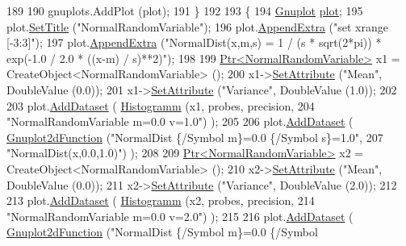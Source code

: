 \begin{DoxyCode}
189 
190     gnuplots.AddPlot (plot);
191   \}
192 
193   \{
194     \hyperlink{classns3_1_1Gnuplot}{Gnuplot} \hyperlink{lte__amc_8m_a5942306abe9f005572e4344e3cdef528}{plot};
195     plot.\hyperlink{classns3_1_1Gnuplot_ac01f15633d49f0239f8a45293a1e04f0}{SetTitle} (\textcolor{stringliteral}{"NormalRandomVariable"});
196     plot.\hyperlink{classns3_1_1Gnuplot_a649a3041b9d0ea21a212b5ad9b28ecbf}{AppendExtra} (\textcolor{stringliteral}{"set xrange [-3:3]"});
197     plot.\hyperlink{classns3_1_1Gnuplot_a649a3041b9d0ea21a212b5ad9b28ecbf}{AppendExtra} (\textcolor{stringliteral}{"NormalDist(x,m,s) = 1 / (s * sqrt(2*pi)) * exp(-1.0 / 2.0 * ((x-m) /
       s)**2)"});
198 
199     \hyperlink{classns3_1_1Ptr}{Ptr<NormalRandomVariable>} x1 = CreateObject<NormalRandomVariable> ();
200     x1->\hyperlink{classns3_1_1ObjectBase_ac60245d3ea4123bbc9b1d391f1f6592f}{SetAttribute} (\textcolor{stringliteral}{"Mean"}, DoubleValue (0.0));
201     x1->\hyperlink{classns3_1_1ObjectBase_ac60245d3ea4123bbc9b1d391f1f6592f}{SetAttribute} (\textcolor{stringliteral}{"Variance"}, DoubleValue (1.0));
202 
203     plot.\hyperlink{classns3_1_1Gnuplot_a306ec724a327cf9ab699700f31fca0a1}{AddDataset} ( \hyperlink{main-random-variable-stream_8cc_a2cfd3837ab3f2e816cf53486d7a186b5}{Histogramm} (x1, probes, precision,
204                                   \textcolor{stringliteral}{"NormalRandomVariable m=0.0 v=1.0"}) );
205 
206     plot.\hyperlink{classns3_1_1Gnuplot_a306ec724a327cf9ab699700f31fca0a1}{AddDataset} ( \hyperlink{classns3_1_1Gnuplot2dFunction}{Gnuplot2dFunction} (\textcolor{stringliteral}{"NormalDist \{/Symbol m\}=0.0 \{/Symbol
       s\}=1.0"},
207                                          \textcolor{stringliteral}{"NormalDist(x,0.0,1.0)"}) );
208 
209     \hyperlink{classns3_1_1Ptr}{Ptr<NormalRandomVariable>} x2 = CreateObject<NormalRandomVariable> ();
210     x2->\hyperlink{classns3_1_1ObjectBase_ac60245d3ea4123bbc9b1d391f1f6592f}{SetAttribute} (\textcolor{stringliteral}{"Mean"}, DoubleValue (0.0));
211     x2->\hyperlink{classns3_1_1ObjectBase_ac60245d3ea4123bbc9b1d391f1f6592f}{SetAttribute} (\textcolor{stringliteral}{"Variance"}, DoubleValue (2.0));
212 
213     plot.\hyperlink{classns3_1_1Gnuplot_a306ec724a327cf9ab699700f31fca0a1}{AddDataset} ( \hyperlink{main-random-variable-stream_8cc_a2cfd3837ab3f2e816cf53486d7a186b5}{Histogramm} (x2, probes, precision,
214                                   \textcolor{stringliteral}{"NormalRandomVariable m=0.0 v=2.0"}) );
215 
216     plot.\hyperlink{classns3_1_1Gnuplot_a306ec724a327cf9ab699700f31fca0a1}{AddDataset} ( \hyperlink{classns3_1_1Gnuplot2dFunction}{Gnuplot2dFunction} (\textcolor{stringliteral}{"NormalDist \{/Symbol m\}=0.0 \{/Symbol
}
\end{DoxyCode}
